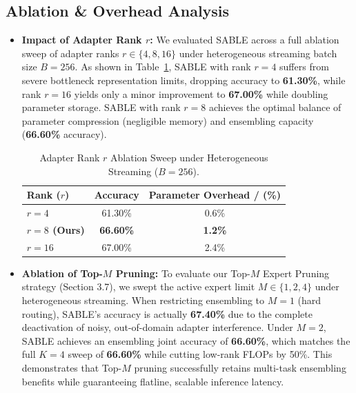 \subsection{Ablation \& Overhead Analysis}
\begin{itemize}
    \item \textbf{Impact of Adapter Rank $r$:} We evaluated SABLE across a full ablation sweep of adapter ranks $r \in \{4, 8, 16\}$ under heterogeneous streaming batch size $B=256$. As shown in Table~\ref{tab:rank_ablation}, SABLE with rank $r=4$ suffers from severe bottleneck representation limits, dropping accuracy to \textbf{61.30\%}, while rank $r=16$ yields only a minor improvement to \textbf{67.00\%} while doubling parameter storage. SABLE with rank $r=8$ achieves the optimal balance of parameter compression (negligible memory) and ensembling capacity (\textbf{66.60\%} accuracy).
    \begin{table}[htbp]
    \caption{Adapter Rank $r$ Ablation Sweep under Heterogeneous Streaming ($B=256$).}
    \label{tab:rank_ablation}
    \vskip 0.1in
    \begin{center}
    \begin{small}
    \begin{sc}
    \begin{tabular}{lcc}
    \toprule
    Rank ($r$) & Accuracy & Parameter Overhead / (\%) \\
    \midrule
    $r=4$ & 61.30\% & 0.6\% \\
    \textbf{$r=8$ (Ours)} & \textbf{66.60\%} & \textbf{1.2\%} \\
    $r=16$ & 67.00\% & 2.4\% \\
    \bottomrule
    \end{tabular}
    \end{sc}
    \end{small}
    \end{center}
    \end{table}
    
    \item \textbf{Ablation of Top-$M$ Pruning:} To evaluate our Top-$M$ Expert Pruning strategy (Section 3.7), we swept the active expert limit $M \in \{1, 2, 4\}$ under heterogeneous streaming. When restricting ensembling to $M=1$ (hard routing), SABLE's accuracy is actually \textbf{67.40\%} due to the complete deactivation of noisy, out-of-domain adapter interference. Under $M=2$, SABLE achieves an ensembling joint accuracy of \textbf{66.60\%}, which matches the full $K=4$ sweep of \textbf{66.60\%} while cutting low-rank FLOPs by 50\%. This demonstrates that Top-$M$ pruning successfully retains multi-task ensembling benefits while guaranteeing flatline, scalable inference latency.
    

\end{itemize}
